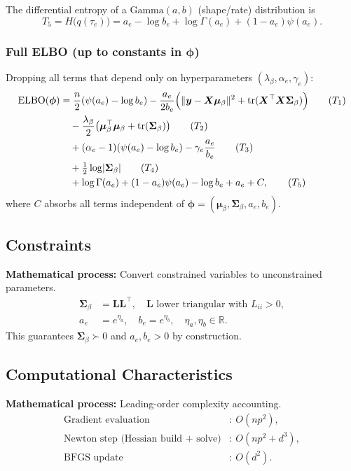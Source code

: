 \documentclass[11pt]{article}
\newcommand{\R}{\mathbb{R}}
\newcommand{\ELBO}{\mathrm{ELBO}}
\newcommand{\tr}{\mathrm{tr}}
\begin{document}
The differential entropy of a $\mathrm{Gamma}(a,b)$ (shape/rate) distribution is
\begin{equation}
T_5 = H\!\bigl(q(\tau_e)\bigr)
= a_e - \log b_e + \log\Gamma(a_e) + (1-a_e)\psi(a_e).
\end{equation}

\subsubsection*{Full ELBO (up to constants in $\bm\phi$)}

Dropping all terms that depend only on hyperparameters $(\lambda_\beta,\alpha_e,\gamma_e)$:
\begin{align}
\ELBO(\bm\phi)
&= \frac{n}{2}(\psi(a_e)-\log b_e)
   -\frac{a_e}{2b_e}\Bigl(\|\bm y-\bm X\bm\mu_\beta\|^2
   +\tr(\bm X^\top\bm X\bm\Sigma_\beta)\Bigr)
   \tag{$T_1$}\\
&\quad
   -\frac{\lambda_\beta}{2}\bigl(\bm\mu_\beta^\top\bm\mu_\beta+\tr(\bm\Sigma_\beta)\bigr)
   \tag{$T_2$}\\
&\quad
   +(\alpha_e-1)(\psi(a_e)-\log b_e)
   -\gamma_e\frac{a_e}{b_e}
   \tag{$T_3$}\\
&\quad
   +\tfrac{1}{2}\log\lvert\bm\Sigma_\beta\rvert
   \tag{$T_4$}\\
&\quad
   +\log\Gamma(a_e)+(1-a_e)\psi(a_e)-\log b_e+a_e
   +C,
   \tag{$T_5$}
\end{align}
where $C$ absorbs all terms independent of $\bm\phi=(\bm\mu_\beta,\bm\Sigma_\beta,a_e,b_e)$.

\subsection*{Constraints}

\textbf{Mathematical process:} Convert constrained variables to unconstrained parameters.
\begin{align}
\bm\Sigma_\beta &= \bm L\bm L^\top,\quad \bm L \text{ lower triangular with } L_{ii}>0,\\
a_e &= e^{\eta_a},\quad b_e=e^{\eta_b},\quad \eta_a,\eta_b\in\R.
\end{align}
This guarantees $\bm\Sigma_\beta\succ0$ and $a_e,b_e>0$ by construction.

\subsection*{Computational Characteristics}

\textbf{Mathematical process:} Leading-order complexity accounting.
\begin{align}
\text{Gradient evaluation} &:\ O(np^2),\\
\text{Newton step (Hessian build + solve)} &:\ O(np^2+d^3),\\
\text{BFGS update} &:\ O(d^2).
\end{align}
\end{document}

